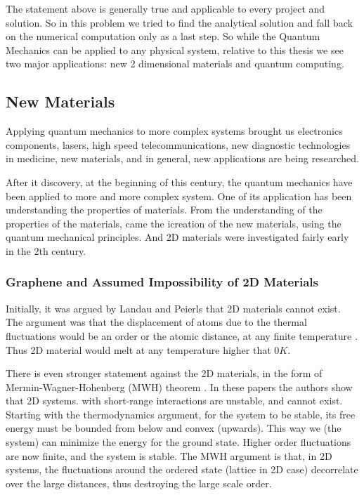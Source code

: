 The statement above is generally true and applicable to every project and solution. So in this problem we tried to find the analytical solution and fall back on the numerical computation only as a last step. So while the Quantum Mechanics can be applied to any physical system, relative to this thesis we see two major applications: new 2 dimensional materials and quantum computing.

\subsection*{New Materials}

Applying quantum mechanics to more complex systems brought us electronics components, lasers, high speed telecommunications, new diagnostic technologies in medicine, new materials, and in general, new applications are being researched.

After it discovery, at the beginning of this century, the quantum mechanics have been applied to more and more complex system. One of its application has been understanding the properties of materials.
From the understanding of the properties of the materials, came the icreation of the new materials, using the quantum mechanical principles. And 2D materials were investigated fairly early in the 2th century.

\subsubsection{Graphene and Assumed Impossibility of 2D Materials}

Initially, it was argued by Landau and Peierls \cite{LandauG}\cite{Pierls} that 2D materials cannot exist. The argument was that the displacement of atoms due to the thermal fluctuations would be an order or the atomic distance, at any finite temperature \cite{LandauG, Pierls}. Thus 2D material would melt at any temperature higher that $ 0 K $. 

There is even stronger statement against the 2D materials, in the form of Mermin-Wagner-Hohenberg (MWH) theorem \cite{Hohenberg}\cite{Mermin}. In these papers the authors show that 2D systems. with short-range interactions are unstable, and cannot exist. 
Starting with the thermodynamics argument, for the system to be stable, its free energy must be bounded from below and convex (upwards). This way we (the system) can minimize the energy for the ground state. Higher order fluctuations are now finite, and the system is stable.
The MWH argument is that, in 2D systems, the fluctuations around the ordered state (lattice in 2D case) decorrelate over the large distances, thus destroying the large scale order. 

